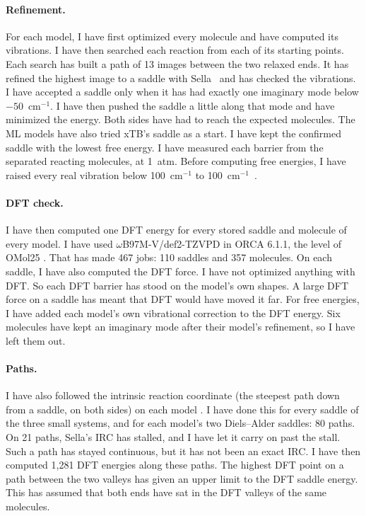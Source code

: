 \documentclass[11pt]{article}
\begin{document}
\paragraph{Refinement.} For each model, I have first optimized every
molecule and have computed its vibrations. I have then searched each
reaction from each of its starting points. Each search has built a path of
13 images between the two relaxed ends. It has refined the highest image
to a saddle with Sella~\cite{sella} and has checked the vibrations. I have
accepted a saddle only when it has had exactly one imaginary mode below
$-50$~cm$^{-1}$. I have then pushed the saddle a little along that mode
and have minimized the energy. Both sides have had to reach the expected
molecules. The ML models have also tried xTB's saddle as a start. I have kept
the confirmed saddle with the lowest free energy. I have measured each
barrier from the separated reacting molecules, at 1~atm. Before computing
free energies, I have raised every real vibration below 100~cm$^{-1}$ to
100~cm$^{-1}$~\cite{truhlar2011}.

\paragraph{DFT check.} I have then computed one DFT energy for every
stored saddle and molecule of every model. I have used
$\omega$B97M-V/def2-TZVPD in ORCA 6.1.1, the level of OMol25
\cite{wb97mv,orca}. That has made 467 jobs: 110 saddles and 357
molecules. On each saddle, I have also computed the DFT force. I have not
optimized anything with DFT. So each DFT barrier has stood on the model's
own shapes. A large DFT force on a saddle has meant that DFT would have
moved it far. For free energies, I have added each model's own vibrational
correction to the DFT energy. Six molecules have kept an imaginary mode
after their model's refinement, so I have left them out.

\paragraph{Paths.} I have also followed the intrinsic reaction coordinate
(the steepest path down from a saddle, on both sides) on each model
\cite{fukui1981,sella}. I have done this for every saddle of the three
small systems, and for each model's two Diels--Alder saddles: 80 paths. On
21 paths, Sella's IRC has stalled, and I have let it carry on past the
stall. Such a path has stayed continuous, but it has not been an exact
IRC. I have then computed 1,281 DFT energies along these paths. The
highest DFT point on a path between the two valleys has given an upper
limit to the DFT saddle energy. This has assumed that both ends have
sat in the DFT valleys of the same molecules.
\end{document}
